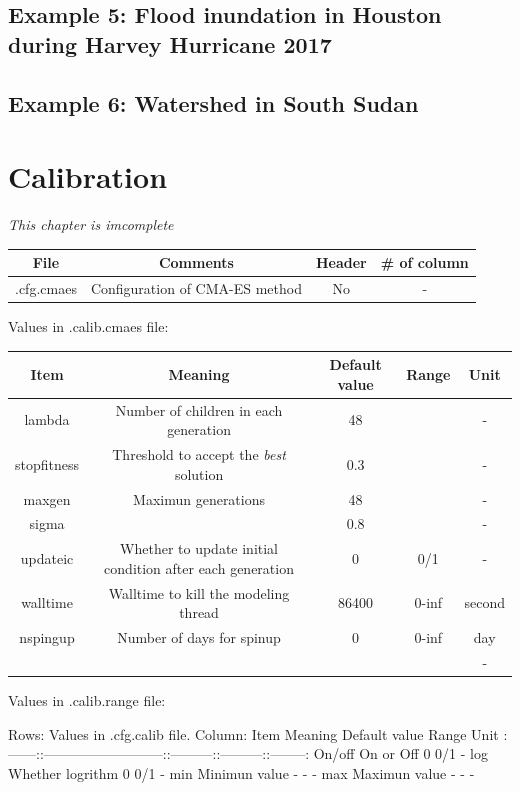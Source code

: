 \documentclass[]{scrbook}
\begin{document}
\section{Example 5: Flood inundation in Houston during Harvey Hurricane
2017}\label{example-5-flood-inundation-in-houston-during-harvey-hurricane-2017}

\section{Example 6: Watershed in South
Sudan}\label{example-6-watershed-in-south-sudan}

\chapter{Calibration}\label{calibration}

\emph{This chapter is imcomplete}

\begin{longtable}[]{@{}cccc@{}}
\toprule
File & Comments & Header & \# of column\tabularnewline
\midrule
\endhead
.cfg.cmaes & Configuration of CMA-ES method & No & -\tabularnewline
\bottomrule
\end{longtable}

Values in .calib.cmaes file:

\begin{longtable}[]{@{}ccccc@{}}
\toprule
Item & Meaning & Default value & Range & Unit\tabularnewline
\midrule
\endhead
lambda & Number of children in each generation & 48 & & -\tabularnewline
stopfitness & Threshold to accept the \emph{best} solution & 0.3 & &
-\tabularnewline
maxgen & Maximun generations & 48 & & -\tabularnewline
sigma & & 0.8 & & -\tabularnewline
updateic & Whether to update initial condition after each generation & 0
& 0/1 & -\tabularnewline
walltime & Walltime to kill the modeling thread & 86400 & 0-inf &
second\tabularnewline
nspingup & Number of days for spinup & 0 & 0-inf & day\tabularnewline
& & & & -\tabularnewline
\bottomrule
\end{longtable}

Values in .calib.range file:

Rows: Values in .cfg.calib file. Column: \textbar{} Item \textbar{}
Meaning \textbar{} Default value \textbar{} Range \textbar{} Unit
\textbar{}
\textbar{}:------:\textbar{}:--------------------------:\textbar{}:---------:\textbar{}:---------:\textbar{}:--------:\textbar{}
\textbar{} On/off \textbar{} On or Off \textbar{} 0 \textbar{} 0/1
\textbar{} - \textbar{} \textbar{} log \textbar{} Whether logrithm
\textbar{} 0 \textbar{} 0/1 \textbar{} - \textbar{} \textbar{} min
\textbar{} Minimun value \textbar{} - \textbar{} - \textbar{} -
\textbar{} \textbar{} max \textbar{} Maximun value \textbar{} -
\textbar{} - \textbar{} - \textbar{}
\end{document}
